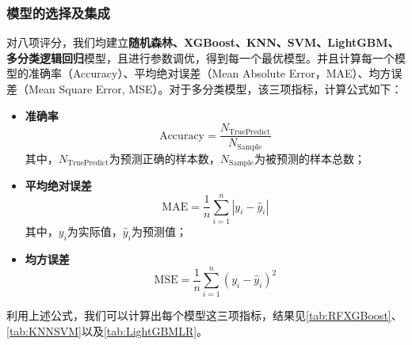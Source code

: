 \documentclass{MathorCupmodeling}
\begin{document}
	\subsubsection{模型的选择及集成}
	对八项评分，我们均建立\textbf{随机森林、XGBoost、KNN、SVM、LightGBM、多分类逻辑回归}模型，且进行参数调优，得到每一个最优模型。并且计算每一个模型的准确率（Accuracy）、平均绝对误差（Mean Absolute Error，MAE）、均方误差（Mean Square Error, MSE）。对于多分类模型，该三项指标，计算公式如下：
	\begin{itemize}
		\item \textbf{准确率}
			\begin{equation}
			\mathrm{Accuracy}=\frac{N_{\mathrm{TruePredict}}}{N_{\mathrm{Sample}}} \label{Accuracy}
			\end{equation}
		其中，$N_{\mathrm{TruePredict}}$为预测正确的样本数，$N_{\mathrm{Sample}}$为被预测的样本总数；
		\item \textbf{平均绝对误差}
			\begin{equation}
			\mathrm{MAE}=\frac{1}{n}\sum_{i=1}^{n}\left|y_{i}-\hat{y}_{i}\right| \label{MAE}
			\end{equation}
		其中，$y_i$为实际值，$\hat{y}_i$为预测值；
		\item \textbf{均方误差}
			\begin{equation}
			\mathrm{MSE}=\frac{1}{n}\sum_{i=1}^{n}\left(y_{i}-\hat{y}_{i}\right)^{2} \label{MSE}
			\end{equation}
	\end{itemize}
	利用上述公式，我们可以计算出每个模型这三项指标，结果见\textcolor{blue}{\cref{tab:RFXGBoost}}、\textcolor{blue}{\cref{tab:KNNSVM}}以及\textcolor{blue}{\cref{tab:LightGBMLR}}。
\end{document}
